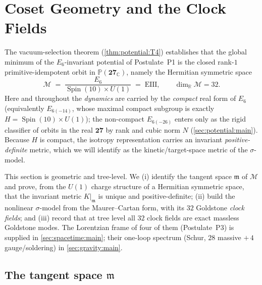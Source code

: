 \documentclass[11pt]{article}
\theoremstyle{plain}
\theoremstyle{definition}
\theoremstyle{remark}
\newcommand{\Spin}{\operatorname{Spin}}
\begin{document}
\section{Coset Geometry and the Clock Fields}
\label{sec:coset:main}
\label{sec:foundations:coset}
\label{sec:sigma}
\label{sec:foundation:tangent}

The vacuum-selection theorem (\autoref{thm:potential:T4}) establishes that the
global minimum of the $E_{6}$-invariant potential of Postulate~P1 is the closed
rank-$1$ primitive-idempotent orbit in $\mathbb P(\mathbf{27}_{\mathbb C})$, namely
the Hermitian symmetric space
\begin{equation}\label{eq:coset:vacuum}
  \mathcal M \;=\; \frac{E_{6}}{\Spin(10)\times U(1)} \;=\; \mathrm{EIII},
  \qquad \dim_{\mathbb R}\mathcal M = 32 .
\end{equation}
Here and throughout the \emph{dynamics} are carried by the \emph{compact} real
form of $E_{6}$ (equivalently $E_{6(-14)}$, whose maximal compact subgroup is
exactly $H = \Spin(10)\times U(1)$); the non-compact $E_{6(-26)}$ enters only as
the rigid classifier of orbits in the real $\mathbf{27}$ by rank and cubic norm
$N$ (\autoref{sec:potential:main}). Because $H$ is compact, the isotropy
representation carries an invariant \emph{positive-definite} metric, which we
will identify as the kinetic/target-space metric of the $\sigma$-model.

This section is geometric and tree-level. We (i) identify the tangent space
$\mathfrak m$ of $\mathcal M$ and prove, from the $U(1)$ charge structure of a
Hermitian symmetric space, that the invariant metric $K|_{\mathfrak m}$ is unique
and positive-definite; (ii) build the nonlinear $\sigma$-model from the
Maurer--Cartan form, with its $32$ Goldstone \emph{clock fields}; and (iii)
record that at tree level all $32$ clock fields are exact massless Goldstone
modes. The Lorentzian frame of four of them (Postulate~P3) is supplied in
\autoref{sec:spacetime:main}; their one-loop spectrum (Schur, $28$ massive $+\,4$
gauge/soldering) in \autoref{sec:gravity:main}.

\subsection{The tangent space \texorpdfstring{$\mathfrak m$}{m}}
\label{sec:coset:tangent}
\end{document}
